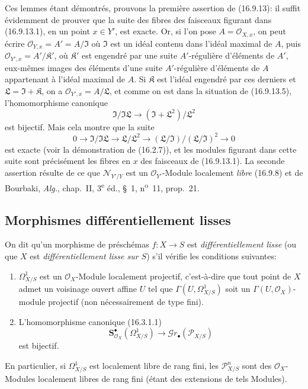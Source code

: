 Ces lemmes étant démontrés, prouvons la première assertion de (16.9.13): il
suffit
évidemment de prouver que la suite des fibres des faisceaux figurant dans
(16.9.13.1), en un point $x\in Y'$, est exacte. Or, si l'on pose
$A=\mathcal{O}_{X,x}$, on peut écrire
$\mathcal{O}_{Y,x}=A'=A/\mathfrak{I}$ où $\mathfrak{I}$ est un idéal contenu
dans l'idéal maximal de $A$, puis
$\mathcal{O}_{Y',x}=A'/\mathfrak{K}'$, où $\mathfrak{K}'$ est engendré par une
suite $A'$-régulière d'éléments de $A'$, eux-mêmes images des éléments d'une
suite $A'$-régulière d'éléments de $A$ appartenant à l'idéal maximal de $A$.
Si $\mathfrak{K}$ est l'idéal engendré par ces derniers et
$\mathfrak{L}=\mathfrak{I}+\mathfrak{K}$, on a
$\mathcal{O}_{Y',x}=A/\mathfrak{L}$, et comme on est dans la situation de
(16.9.13.5), l'homomorphisme canonique
\[
  \mathfrak{I}/\mathfrak{I}\mathfrak{L}
  \longrightarrow(\mathfrak{I}+\mathfrak{L}^2)/\mathfrak{L}^2
\]
est bijectif. Mais cela montre que la suite
\[
  0\longrightarrow\mathfrak{I}/\mathfrak{I}\mathfrak{L}
  \longrightarrow\mathfrak{L}/\mathfrak{L}^2
  \longrightarrow(\mathfrak{L}/\mathfrak{I})/
    (\mathfrak{L}/\mathfrak{I})^2\longrightarrow0
\]
est exacte (voir la démonstration de (16.2.7)), et les modules figurant dans
cette suite sont précisément les fibres en $x$ des faisceaux de (16.9.13.1).
La seconde assertion résulte de ce que $\mathcal{N}_{Y'/Y}$ est un
$\mathcal{O}_{Y'}$-Module localement \emph{libre} (16.9.8) et de Bourbaki,
\emph{Alg.}, chap.~II, 3\textsuperscript{e} éd., §~1, n\textsuperscript{o}~11,
prop.~21.

\subsection{Morphismes différentiellement lisses}
\label{IV.16.10}

\begin{definition}[16.10.1]
\label{IV.16.10.1}
On dit qu'un morphisme de préschémas $f:X\to S$ est
\emph{différentiellement lisse} (ou que $X$ est \emph{différentiellement
lisse sur $S$}) s'il vérifie les conditions suivantes:
\begin{enumerate}
  \item[(i)] $\Omega_{X/S}^1$ est un $\mathcal{O}_X$-Module localement
  projectif, c'est-à-dire que tout point de $X$ admet un voisinage ouvert
  affine $U$ tel que $\Gamma(U,\Omega_{X/S}^1)$ soit un
  $\Gamma(U,\mathcal{O}_X)$-module projectif (non nécessairement de type
  fini).
  \item[(ii)] L'homomorphisme canonique (16.3.1.1)
  \[
    \mathbf{S}_{\mathcal{O}_X}^{\bullet}(\Omega_{X/S}^1)
    \longrightarrow\mathscr{G}r_{\bullet}(\mathscr{P}_{X/S})
  \]
  est bijectif.
\end{enumerate}
En particulier, si $\Omega_{X/S}^1$ est localement libre de rang fini, les
$\mathscr{P}_{X/S}^n$ sont des $\mathcal{O}_X$-Modules localement libres de
rang fini (étant des extensions de tels Modules).
\end{definition}

